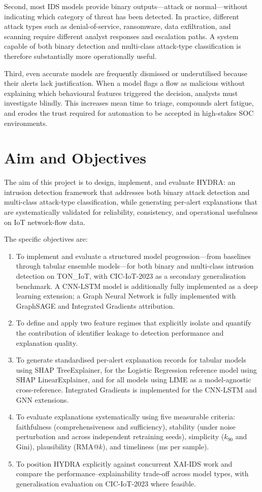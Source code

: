 \documentclass[12pt,a4paper]{report}
\begin{document}
Second, most IDS models provide binary outputs---attack or normal---without indicating which category of threat has been detected. In practice, different attack types such as denial-of-service, ransomware, data exfiltration, and scanning require different analyst responses and escalation paths. A system capable of both binary detection and multi-class attack-type classification is therefore substantially more operationally useful.

Third, even accurate models are frequently dismissed or underutilised because their alerts lack justification. When a model flags a flow as malicious without explaining which behavioural features triggered the decision, analysts must investigate blindly. This increases mean time to triage, compounds alert fatigue, and erodes the trust required for automation to be accepted in high-stakes SOC environments.

\section{Aim and Objectives}
\label{sec:aim}

The aim of this project is to design, implement, and evaluate HYDRA: an intrusion detection framework that addresses both binary attack detection and multi-class attack-type classification, while generating per-alert explanations that are systematically validated for reliability, consistency, and operational usefulness on IoT network-flow data.

The specific objectives are:
\begin{enumerate}
  \item To implement and evaluate a structured model progression---from baselines through tabular ensemble models---for both binary and multi-class intrusion detection on TON\_IoT, with CIC-IoT-2023 as a secondary generalisation benchmark. A CNN-LSTM model is additionally fully implemented as a deep learning extension; a Graph Neural Network is fully implemented with GraphSAGE and Integrated Gradients attribution.
  \item To define and apply two feature regimes that explicitly isolate and quantify the contribution of identifier leakage to detection performance and explanation quality.
  \item To generate standardised per-alert explanation records for tabular models using SHAP TreeExplainer, for the Logistic Regression reference model using SHAP LinearExplainer, and for all models using LIME as a model-agnostic cross-reference. Integrated Gradients is implemented for the CNN-LSTM and GNN extensions.
  \item To evaluate explanations systematically using five measurable criteria: faithfulness (comprehensiveness and sufficiency), stability (under noise perturbation and across independent retraining seeds), simplicity ($k_{90}$ and Gini), plausibility (RMA@$k$), and timeliness (ms per sample).
  \item To position HYDRA explicitly against concurrent XAI-IDS work and compare the performance--explainability trade-off across model types, with generalisation evaluation on CIC-IoT-2023 where feasible.
\end{enumerate}
\end{document}
